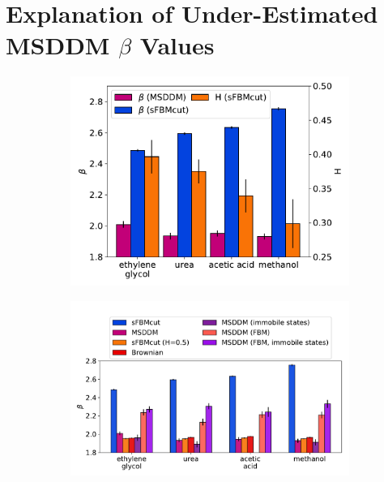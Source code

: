 \documentclass{article}
\begin{document}

  \newpage

  \section{Explanation of Under-Estimated MSDDM $\beta$ Values}\label{section:beta_estimates}
  
  \begin{figure}[h]
  \centering
  \begin{subfigure}{0.43\textwidth}
  \includegraphics[width=\textwidth]{beta_hurst.pdf}
  \caption{}\label{fig:beta_hurst}
  \end{subfigure}
  \begin{subfigure}{0.52\textwidth}
  \includegraphics[width=\textwidth]{beta_parameters.pdf}

\end{subfigure}
\end{figure}
\end{document}
